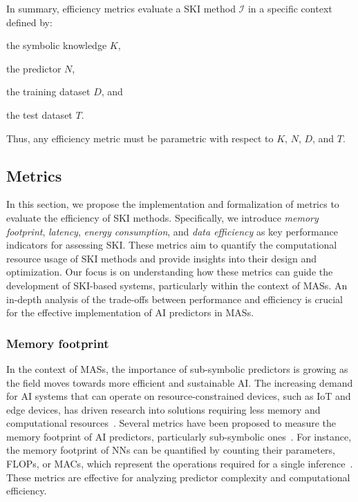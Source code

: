 In summary, efficiency metrics evaluate a \gls{SKI} method \(\mathcal{I}\) in a specific context defined by:
%
\begin{inlinelist}
    \item the symbolic knowledge \(K\),
    \item the predictor \(N\),
    \item the training dataset \(D\), and
    \item the test dataset \(T\).
\end{inlinelist}
%
Thus, any efficiency metric must be parametric with respect to \(K\), \(N\), \(D\), and \(T\).


\subsection{Metrics}\label{subsec:ski-meets-intelligent-agents-metrics}
%
In this section, we propose the implementation and formalization of metrics to evaluate the efficiency of \gls{SKI} methods.
%
Specifically, we introduce \emph{memory footprint}, \emph{latency}, \emph{energy consumption}, and \emph{data efficiency} as key performance indicators for assessing \gls{SKI}.
%
These metrics aim to quantify the computational resource usage of \gls{SKI} methods and provide insights into their design and optimization.
%
Our focus is on understanding how these metrics can guide the development of \gls{SKI}-based systems, particularly within the context of \glspl{MAS}.
%
An in-depth analysis of the trade-offs between performance and efficiency is crucial for the effective implementation of AI predictors in \glspl{MAS}.
%

\subsubsection{Memory footprint}\label{subsubsec:ski-meets-intelligent-agents-memory-footprint}
%
In the context of \glspl{MAS}, the importance of sub-symbolic predictors is growing as the field moves towards more efficient and sustainable \gls{AI}.
%
The increasing demand for \gls{AI} systems that can operate on resource-constrained devices, such as IoT and edge devices, has driven research into solutions requiring less memory and computational resources~\cite{CITATION}.
%
Several metrics have been proposed to measure the memory footprint of \gls{AI} predictors, particularly sub-symbolic ones~\cite{CITATION}.
%
For instance, the memory footprint of \glspl{NN} can be quantified by counting their parameters, \glspl{FLOP}, or \glspl{MAC}, which represent the operations required for a single inference~\cite{CITATION}.
%
These metrics are effective for analyzing predictor complexity and computational efficiency.

